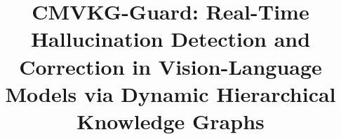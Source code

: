 \documentclass[conference]{IEEEtran}
\begin{document}
\title{CMVKG-Guard: Real-Time Hallucination Detection and Correction in Vision-Language Models via Dynamic Hierarchical Knowledge Graphs}

\author{
}

\maketitle









\end{document}
